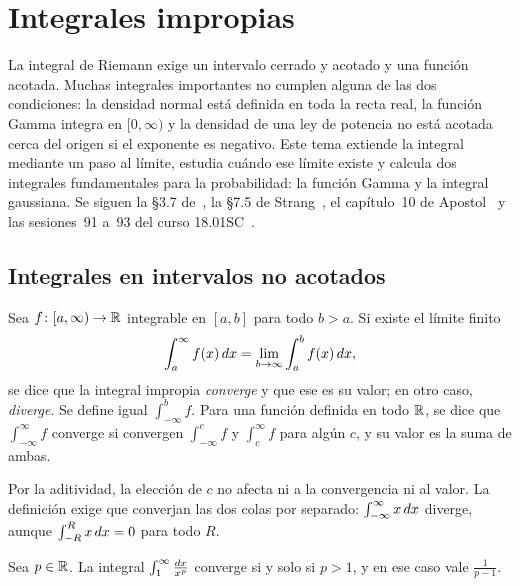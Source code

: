 \chapter{Integrales impropias}
\label{tema:4}

La integral de Riemann exige un intervalo cerrado y acotado y una función acotada. Muchas integrales importantes no cumplen alguna de las dos condiciones: la densidad normal está definida en toda la recta real, la función Gamma integra en $[0,\infty)$ y la densidad de una ley de potencia no está acotada cerca del origen si el exponente es negativo. Este tema extiende la integral mediante un paso al límite, estudia cuándo ese límite existe y calcula dos integrales fundamentales para la probabilidad: la función Gamma y la integral gaussiana. Se siguen la §3.7 de~\cite{openstax2}, la §7.5 de Strang~\cite{strang}, el capítulo~10 de Apostol~\cite{apostol} y las sesiones~91 a~93 del curso 18.01SC~\cite{mit1801}.

\section{Integrales en intervalos no acotados}

\begin{definicion}\label{def:impropia1}
Sea $f\colon[a,\infty)\to\mathbb{R}$ integrable en $[a,b]$ para todo $b>a$. Si existe el límite finito
\[
\int_a^{\infty}f(x)\mathop{}\!d x=\lim_{b\to\infty}\int_a^{b}f(x)\mathop{}\!d x,
\]
se dice que la integral impropia \emph{converge} y que ese es su valor; en otro caso, \emph{diverge}. Se define igual $\int_{-\infty}^{b}f$. Para una función definida en todo $\mathbb{R}$, se dice que $\int_{-\infty}^{\infty}f$ converge si convergen $\int_{-\infty}^{c}f$ y $\int_{c}^{\infty}f$ para algún $c$, y su valor es la suma de ambas.
\end{definicion}

Por la aditividad, la elección de $c$ no afecta ni a la convergencia ni al valor. La definición exige que converjan las dos colas por separado: $\int_{-\infty}^{\infty}x\mathop{}\!d x$ diverge, aunque $\int_{-R}^{R}x\mathop{}\!d x=0$ para todo $R$.

\begin{proposicion}\label{prop:p-infinito}
Sea $p\in\mathbb{R}$. La integral $\int_1^{\infty}\frac{\mathop{}\!d x}{x^{p}}$ converge si y solo si $p>1$, y en ese caso vale $\frac{1}{p-1}$.
\end{proposicion}

